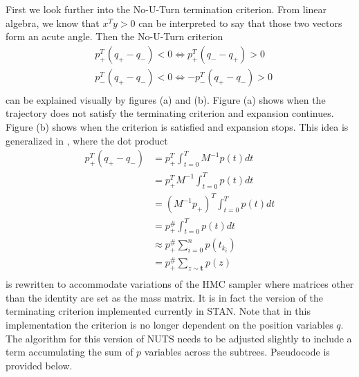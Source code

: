 \documentclass[12pt]{report}
\begin{document}
First we look further into the No-U-Turn termination criterion. From linear algebra, we know that $x^Ty > 0 $ can be interpreted to say that those two vectors form an acute angle. Then the No-U-Turn criterion 
\begin{align*}
&p_{+}^T (q_+ -q_-) < 0 \Leftrightarrow p_+^T (q_- - q_+) > 0 \\
&p_{-}^T (q_+ -q_-) < 0 \Leftrightarrow -p_-^T (q_+ - q_-) > 0 \\
\end{align*}
can be explained visually by figures (a) and (b). Figure (a) shows when the trajectory does not satisfy the terminating criterion and expansion continues. Figure (b) shows when the criterion is satisfied and expansion stops. This idea is generalized in \cite{betancourt2013generalizing}, where the dot product 
\begin{align*}
 p_{+}^T (q_{+} -q_{-})  
 &=p_{+}^T \int_{t=0}^{T} M^{-1}p(t) dt   \\
 &=p_{+}^T M^{-1} \int_{t=0}^{T} p(t)dt \\
 &=(M^{-1} p_{+})^T  \int_{t=0}^{T} p(t)dt \\
 &= p^{\#}_{+}  \int_{t=0}^{T} p(t)dt \\
 &\approx p^{\#}_{+} \sum_{i=0}^n p(t_{k_i}) \\
 &=  p^{\#}_{+} \sum_{z \sim \mathbf{t}} p(z) \\
\end{align*} 
is rewritten to accommodate variations of the HMC sampler where matrices other than the identity are set as the mass matrix. It is in fact the version of the terminating criterion implemented currently in STAN. Note that in this implementation the criterion is no longer dependent on the position variables $q$. The algorithm for this version of NUTS needs to be adjusted slightly to include a term accumulating the sum of $p$ variables across the subtrees. Pseudocode is provided below.
\end{document}
